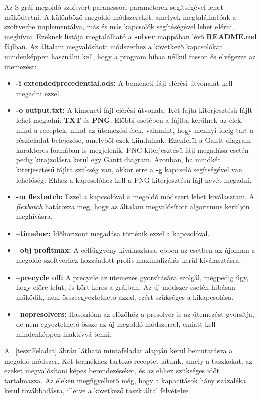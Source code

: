 Az S-gráf megoldó szoftvert parancssori paraméterek segítségével lehet működtetni.
A különböző megoldó módszereket, amelyek megtalálhatóak a szoftverbe implementálva, más és más kapcsolók segítéségével lehet elérni, meghívni.
Ezeknek listája megtalálható a \textbf{solver} mappában lévő \textbf{README.md} fájlban.
Az általam megvalósított módszerhez a következő kapcsolókat mindenképpen használni kell, hogy a program hibaa nélkül fusson és elvégezze az ütemezést:
\begin{itemize}
	\item \textbf{-i extended\textunderscore precedential.ods:} A bemeneti fájl elérési útvonalát kell megadni ezzel.
	\item \textbf{-o output.txt:} A kimeneti fájl elérési útvonala.
	Két fajta kiterjesztésű fájlt lehet megadni: \textbf{TXT} és \textbf{PNG}.
	Előbbi esetében a fájlba kerülnek az élek, mind a receptek, mind az ütemezési élek, valamint, hogy mennyi ideig tart a részfeladat befejezése, amelyből ezek kiindulnak.
	Ezenfelül a Gantt diagram karakteres formában is megjelenik.
	PNG kiterjesztésű fájl megadása esetén pedig kirajzolásra kerül egy Gantt diagram.
	Azonban, ha mindkét kiterjesztésű fájlra szükség van, akkor erre a \textbf{-g} kapcsoló segítségével van lehetőség.
	Ehhez a kapcsolóhoz kell a PNG kiterjesztésű fájl nevét megadni.
	\item \textbf{-m flexbatch:} Ezzel a kapcsolóval a megoldó módszert lehet kiválasztani.
	A \textit{flexbatch} határozza meg, hogy az általam megvalósított algoritmus kerüljön meghívásra.
	\item \textbf{--timehor:} Időhorizont megadása történik ezzel a kapcsolóval.
	\item \textbf{--obj profit\textunderscore max:} A célfüggvény kiválasztása, ebben az esetben az újonnan a megoldó szoftverhez hozzáadott profit maximalizálás kerül kiválasztásra.
	\item \textbf{--precycle off:} A precycle az ütemezés gyorsítására szolgál, mégpedig úgy, hogy előre lefut, és kört keres a gráfban.
	Az új módszer esetén hibásan működik, nem összeegyeztethető azzal, ezért szükséges a kikapcsolása.
	\item \textbf{--nopresolvers:} Hasonlóan az előzőhöz a presolver is az ütemezést gyorsítja, de nem egyeztethető össze az új megoldó módszerrel, emiatt kell mindenképpen inaktívvá tenni.
\end{itemize}

A ~\ref{tesztFeladat} ábrán látható mintafeladat alapján kerül bemutatásra a megoldó módszer.
Két termékhez tartozó receptet látunk, amely a taszkokat, az ezeket megvalósítani képes berendezéseket, és az ehhez szükséges időt tartalmazza.
Az éleken megfigyelhető még, hogy a kapacitások hány százaléka kerül továbbadásra, illetve a következő taszk által felvételre.

